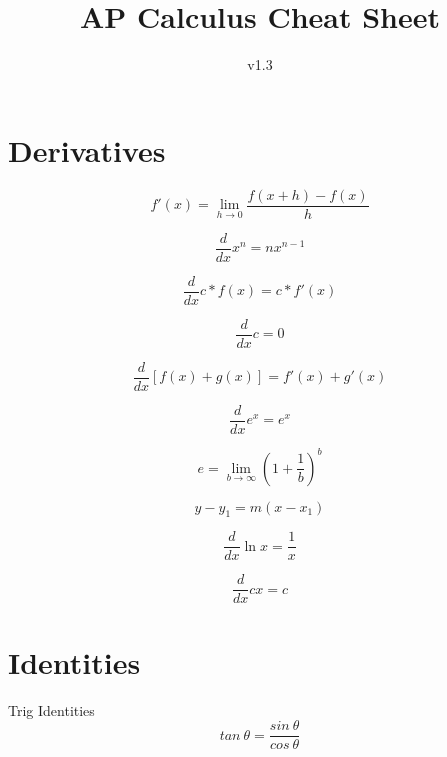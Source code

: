 \documentclass[12pt, english]{article}
\date{}
\title{ AP Calculus Cheat Sheet }
\begin{document}
\author{
	v1.3
}

\maketitle

\section{Derivatives}
\begin{equation}
	f'(x) = \lim_{h \to 0} \frac{f(x+h)-f(x)}{h}
\end{equation}

\begin{equation}
	\frac{d}{dx} x^n = nx^{n-1}
\end{equation}

\begin{equation}
	\frac{d}{dx} c * f(x) = c * f'(x)
\end{equation}

\begin{equation}
	\frac{d}{dx} c = 0
\end{equation}

\begin{equation}
	\frac{d}{dx} [f(x)+g(x)] = f'(x)+g'(x)
\end{equation}

\begin{equation}
	\frac{d}{dx} e^x = e^x
\end{equation}

\begin{equation}
	e = \lim_{b \to \infty} (1+\frac{1}{b})^b
\end{equation}

\begin{equation}
	y-y_1 = m(x-x_1)
\end{equation}

\begin{equation}
	\frac{d}{dx} \ln x = \frac{1}{x}
\end{equation}

\begin{equation}
	\frac{d}{dx} cx = c
\end{equation}

\section{Identities}
Trig Identities
\begin{equation}
	tan\ \theta = \frac{sin\ \theta}{cos\ \theta}
\end{equation}
\end{document}
